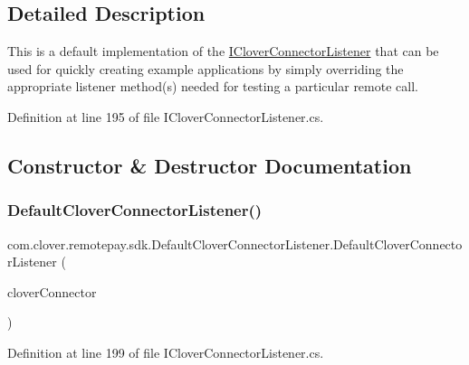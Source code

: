 \subsection{Detailed Description}
This is a default implementation of the \hyperlink{interfacecom_1_1clover_1_1remotepay_1_1sdk_1_1_i_clover_connector_listener}{I\+Clover\+Connector\+Listener} that can be used for quickly creating example applications by simply overriding the appropriate listener method(s) needed for testing a particular remote call. 



Definition at line 195 of file I\+Clover\+Connector\+Listener.\+cs.



\subsection{Constructor \& Destructor Documentation}
\mbox{\label{classcom_1_1clover_1_1remotepay_1_1sdk_1_1_default_clover_connector_listener_a3b49feb5fdc75207df4254e78ae32844}} 
\subsubsection{\texorpdfstring{Default\+Clover\+Connector\+Listener()}{DefaultCloverConnectorListener()}}
{\footnotesize\ttfamily com.\+clover.\+remotepay.\+sdk.\+Default\+Clover\+Connector\+Listener.\+Default\+Clover\+Connector\+Listener (\begin{DoxyParamCaption}\item[{\hyperlink{interfacecom_1_1clover_1_1remotepay_1_1sdk_1_1_i_clover_connector}{I\+Clover\+Connector}}]{clover\+Connector }\end{DoxyParamCaption})}



Definition at line 199 of file I\+Clover\+Connector\+Listener.\+cs.




